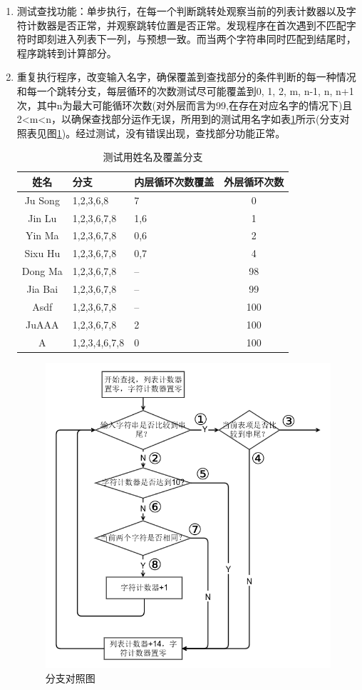 \documentclass{article}
\begin{document}
\begin{enumerate}
			\item 测试查找功能：单步执行，在每一个判断跳转处观察当前的列表计数器以及字符计数器是否正常，并观察跳转位置是否正常。发现程序在首次遇到不匹配字符时即刻进入列表下一列，与预想一致。而当两个字符串同时匹配到结尾时，程序跳转到计算部分。
			\item 重复执行程序，改变输入名字，确保覆盖到查找部分的条件判断的每一种情况和每一个跳转分支，每层循环的次数测试尽可能覆盖到0, 1, 2, m, n-1, n, n+1次，其中n为最大可能循环次数(对外层而言为99,在存在对应名字的情况下)且2<m<n，以确保查找部分运作无误，所用到的测试用名字如表\ref{tab:nametable}所示(分支对照表见图\ref{fig:fig17})。经过测试，没有错误出现，查找部分功能正常。
				\begin{table}[H]
					\centering
					\caption{测试用姓名及覆盖分支}
					\label{tab:nametable}
					\begin{tabular}{c l l c}
						\hline\hline
						姓名& 分支& 内层循环次数覆盖& 外层循环次数 \\
						\hline
						Ju Song & 1,2,3,6,8 & 7 & 0 \\
						Jin Lu & 1,2,3,6,7,8 &1,6 & 1 \\
						Yin Ma & 1,2,3,6,7,8 & 0,6 & 2 \\
						Sixu Hu & 1,2,3,6,7,8 & 0,7 & 4 \\
						Dong Ma & 1,2,3,6,7,8 & -- & 98 \\
						Jia	Bai & 1,2,3,6,7,8 &	-- & 99 \\
						Asdf & 1,2,3,6,7,8 & -- & 100 \\
						JuAAA & 1,2,3,6,7,8 & 2 & 100 \\
						A & 1,2,3,4,6,7,8 & 0 & 100 \\
						\hline
					\end{tabular}
				\end{table}
				\begin{figure}[h]
					\centering
					\includegraphics[width=0.6\linewidth]{res/homework_1/fig17.png}
					\caption{分支对照图}
					\label{fig:fig17}
				\end{figure}


\end{enumerate}
\end{document}
